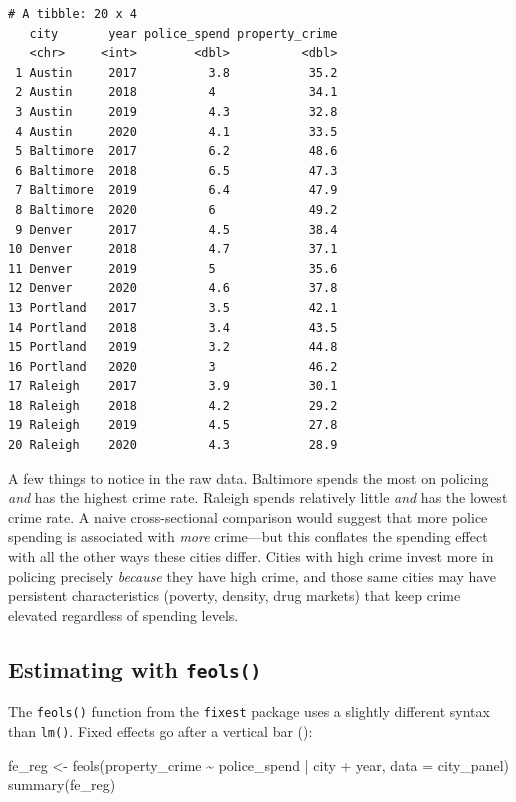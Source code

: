 \documentclass[
  letterpaper,
  DIV=11,
  numbers=noendperiod]{scrreprt}
\newenvironment{Shaded}{\begin{snugshade}}{\end{snugshade}}
\newcommand{\AttributeTok}[1]{\textcolor[rgb]{0.40,0.45,0.13}{#1}}
\newcommand{\FunctionTok}[1]{\textcolor[rgb]{0.28,0.35,0.67}{#1}}
\newcommand{\NormalTok}[1]{\textcolor[rgb]{0.00,0.23,0.31}{#1}}
\newcommand{\OtherTok}[1]{\textcolor[rgb]{0.00,0.23,0.31}{#1}}
\newcommand{\SpecialCharTok}[1]{\textcolor[rgb]{0.37,0.37,0.37}{#1}}
\begin{document}
\begin{verbatim}
# A tibble: 20 x 4
   city       year police_spend property_crime
   <chr>     <int>        <dbl>          <dbl>
 1 Austin     2017          3.8           35.2
 2 Austin     2018          4             34.1
 3 Austin     2019          4.3           32.8
 4 Austin     2020          4.1           33.5
 5 Baltimore  2017          6.2           48.6
 6 Baltimore  2018          6.5           47.3
 7 Baltimore  2019          6.4           47.9
 8 Baltimore  2020          6             49.2
 9 Denver     2017          4.5           38.4
10 Denver     2018          4.7           37.1
11 Denver     2019          5             35.6
12 Denver     2020          4.6           37.8
13 Portland   2017          3.5           42.1
14 Portland   2018          3.4           43.5
15 Portland   2019          3.2           44.8
16 Portland   2020          3             46.2
17 Raleigh    2017          3.9           30.1
18 Raleigh    2018          4.2           29.2
19 Raleigh    2019          4.5           27.8
20 Raleigh    2020          4.3           28.9
\end{verbatim}

A few things to notice in the raw data. Baltimore spends the most on
policing \emph{and} has the highest crime rate. Raleigh spends
relatively little \emph{and} has the lowest crime rate. A naive
cross-sectional comparison would suggest that more police spending is
associated with \emph{more} crime---but this conflates the spending
effect with all the other ways these cities differ. Cities with high
crime invest more in policing precisely \emph{because} they have high
crime, and those same cities may have persistent characteristics
(poverty, density, drug markets) that keep crime elevated regardless of
spending levels.

\subsection{\texorpdfstring{Estimating with
\texttt{feols()}}{Estimating with feols()}}\label{estimating-with-feols}

The \texttt{feols()} function from the \texttt{fixest} package uses a
slightly different syntax than \texttt{lm()}. Fixed effects go after a
vertical bar (\texttt{\textbar{}}):

\begin{Shaded}
\begin{Highlighting}[]
\NormalTok{fe\_reg }\OtherTok{\textless{}{-}} \FunctionTok{feols}\NormalTok{(property\_crime }\SpecialCharTok{\textasciitilde{}}\NormalTok{ police\_spend }\SpecialCharTok{|}\NormalTok{ city }\SpecialCharTok{+}\NormalTok{ year, }\AttributeTok{data =}\NormalTok{ city\_panel)}
\FunctionTok{summary}\NormalTok{(fe\_reg)}
\end{Highlighting}
\end{Shaded}
\end{document}
